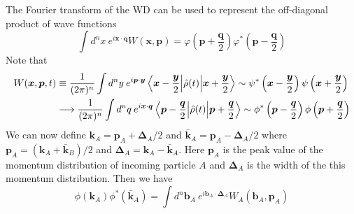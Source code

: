 The Fourier transform of the WD can be used to represent the off-diagonal product of wave functions
\begin{equation}
    \int d^n x \: e^{i \bm{x}  \cdot \bm{q}  } W(\bm{x}, \bm{p}) = \varphi \left(    \bm{p} + \frac{\bm{q}}{2}   \right)\varphi^* \left(    \bm{p} - \frac{\bm{q}}{2}   \right)
\end{equation}
Note that 
\begin{align}
    W(\bm{x},\bm{p} , t) & \equiv \frac{1}{(2\pi)^n} \int d^n y \: e^{i \bm{p} \cdot \bm{y} }   \mel{ \bm{x}  - \frac{\bm{y}}{2}}{\hat{\rho}(t)}{ \bm{x}  + \frac{\bm{y}}{2}} \sim \psi^* \left(  \bm{x}  - \frac{\bm{y}}{2}  \right) \psi \left(  \bm{x}  + \frac{\bm{y}}{2}  \right) \nonumber\\
    & \longrightarrow \frac{1}{(2\pi)^n} \int d^n q \: e^{i \bm{x} \cdot \bm{q} }   \mel{ \bm{p}  - \frac{\bm{q}}{2}}{\hat{\rho}(t)}{\bm{p}  + \frac{\bm{q}}{2}} \sim \phi^* \left(  \bm{p}  - \frac{\bm{q}}{2}  \right) \phi \left( \bm{p}   + \frac{\bm{q}}{2}  \right) \nonumber
\end{align}
We can now define $\bm{k}_A = \bm{p}_A + \bm{\Delta}_{A}/2$ and $\bar{\bm{k}}_A = \bm{p}_A - \bm{\Delta}_A/2$ where $\bm{p}_A = (\bm{k}_A + \bar{\bm{k}}_B)/2$ and $\bm{\Delta}_A = \bm{k}_A - \bar{\bm{k}}_A$. Here $\bm{p}_A$ is the peak value of the momentum distribution of incoming particle $A$ and $\bm{\Delta}_A$ is the width of the this momentum distribution. Then we have
\begin{equation}
    \phi (\bm{k}_A) \phi^* (\bar{\bm{k}}_A) = \int d^n \bm{b}_A \: e^{i \bm{b}_A \cdot \bm{\Delta}_A} W_A (\bm{b}_A , \bm{p}_A)
\end{equation}




